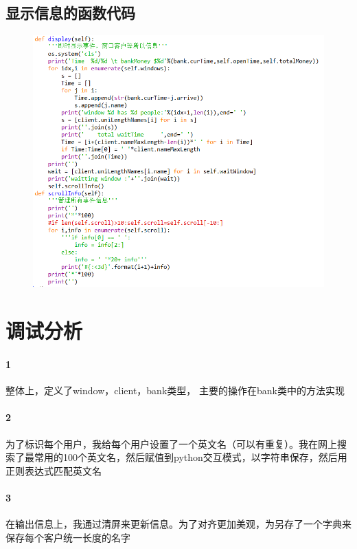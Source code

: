 \documentclass[UTF8]{ctexart}
\begin{document}
\subsection{显示信息的函数代码}
\begin{figure}[H]
  \centering
  \includegraphics[width=1\textwidth]{display.png}
\end{figure}
\section{调试分析}
\paragraph{1}
整体上，定义了window，client，bank类型， 主要的操作在bank类中的方法实现
\paragraph{2}
为了标识每个用户，我给每个用户设置了一个英文名（可以有重复）。我在网上搜索了最常用的100个英文名，然后赋值到python交互模式，以字符串保存，然后用正则表达式匹配英文名
\paragraph{3}
在输出信息上，我通过清屏来更新信息。为了对齐更加美观，为另存了一个字典来保存每个客户统一长度的名字
\end{document}
